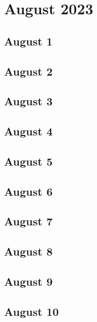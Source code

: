 %
%
%

\chapter{August 2023}
\label{intro} %

\section{August 1}

\section{August 2}

\section{August 3}

\section{August 4}

\section{August 5}

\section{August 6}

\section{August 7}

\section{August 8}

\section{August 9}

\section{August 10}


